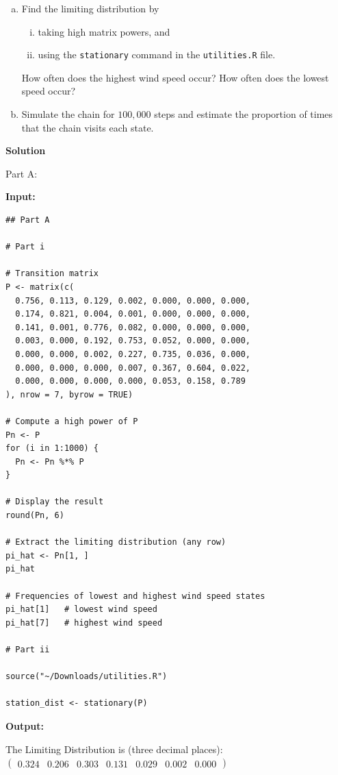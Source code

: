 \documentclass[hidelinks]{article}
\begin{document}
\begin{enumerate}[(a)]
\item Find the limiting distribution by
\begin{enumerate}[(i)]
\item taking high matrix powers, and
\item using the \texttt{stationary} command in the \texttt{utilities.R} file.
\end{enumerate}
How often does the highest wind speed occur? How often does the lowest speed occur?

\item Simulate the chain for $100{,}000$ steps and estimate the proportion of times
that the chain visits each state.
\end{enumerate}

\noindent \textbf{Solution}

\smallskip

\noindent Part A:

\noindent \textbf{Input:}

\begin{lstlisting}[caption={Hourly Wind Speeds of a Region In Turkey}]
## Part A

# Part i

# Transition matrix
P <- matrix(c(
  0.756, 0.113, 0.129, 0.002, 0.000, 0.000, 0.000,
  0.174, 0.821, 0.004, 0.001, 0.000, 0.000, 0.000,
  0.141, 0.001, 0.776, 0.082, 0.000, 0.000, 0.000,
  0.003, 0.000, 0.192, 0.753, 0.052, 0.000, 0.000,
  0.000, 0.000, 0.002, 0.227, 0.735, 0.036, 0.000,
  0.000, 0.000, 0.000, 0.007, 0.367, 0.604, 0.022,
  0.000, 0.000, 0.000, 0.000, 0.053, 0.158, 0.789
), nrow = 7, byrow = TRUE)

# Compute a high power of P
Pn <- P
for (i in 1:1000) {
  Pn <- Pn %*% P
}

# Display the result
round(Pn, 6)

# Extract the limiting distribution (any row)
pi_hat <- Pn[1, ]
pi_hat

# Frequencies of lowest and highest wind speed states
pi_hat[1]   # lowest wind speed
pi_hat[7]   # highest wind speed

# Part ii

source("~/Downloads/utilities.R")

station_dist <- stationary(P)
\end{lstlisting}

\noindent \textbf{Output:}

\noindent The Limiting Distribution is (three decimal places): $\begin{pmatrix}
0.324 & 0.206 & 0.303 & 0.131 & 0.029 & 0.002 & 0.000
\end{pmatrix}$
\end{document}
